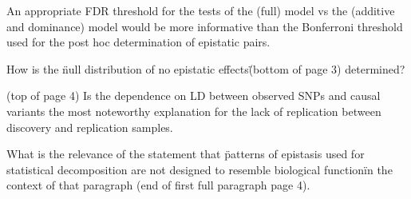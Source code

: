 \documentclass{article}
\begin{document}
An appropriate FDR threshold for the tests of the (full) model vs the (additive and dominance) model would be more informative than the Bonferroni threshold used for the post hoc determination of epistatic pairs.

How is the \"null distribution of no epistatic effects\" (bottom of page 3) determined?

(top of page 4) Is the dependence on LD between observed SNPs and causal variants the most noteworthy explanation for the lack of replication between discovery and replication samples.

What is the relevance of the statement that \"patterns of epistasis used for statistical decomposition are not designed to resemble biological function\" in the context of that paragraph (end of first full paragraph page 4).
\end{document}
